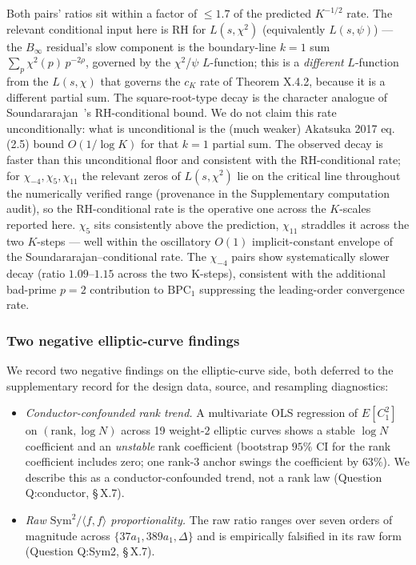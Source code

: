 Both pairs' ratios sit within a factor of \(\le 1.7\) of the
predicted \(K^{-1/2}\) rate. The relevant conditional input here is
RH for \(L(s, \chi^2)\) (equivalently \(L(s,\psi)\)) --- the \(B_\infty\)
residual's slow component is the boundary-line \(k = 1\) sum
\(\sum_p \chi^2(p)\,p^{-2\rho}\), governed by the \(\chi^2\)/\(\psi\)
\(L\)-function; this is a \emph{different} \(L\)-function from the
\(L(s,\chi)\) that governs the \(c_K\) rate of Theorem X.4.2, because
it is a different partial sum. The square-root-type decay is the
character analogue of Soundararajan~\cite{Soundararajan2009}'s RH-conditional bound.
We do not claim this rate unconditionally: what is unconditional
is the (much weaker) Akatsuka 2017 eq. (2.5) bound \(O(1/\log K)\)
for that \(k = 1\) partial sum. The observed decay is faster than
this unconditional floor and consistent with the RH-conditional
rate; for \(\chi_{-4}, \chi_5, \chi_{11}\) the relevant zeros of
\(L(s,\chi^2)\) lie on the critical line throughout the numerically
verified range (provenance in the Supplementary computation
audit), so the RH-conditional rate is the operative one across
the \(K\)-scales reported here.
\(\chi_5\) sits consistently above the prediction, \(\chi_{11}\)
straddles it across the two \(K\)-steps --- well within the
oscillatory \(O(1)\) implicit-constant envelope of the
Soundararajan--conditional rate. The \(\chi_{-4}\) pairs show systematically slower decay
(ratio \(1.09\)--\(1.15\) across the two K-steps), consistent with the
additional bad-prime \(p = 2\) contribution to \(\mathrm{BPC}_1\)
suppressing the leading-order convergence rate.

\subsubsection{Two negative elliptic-curve findings}

We record two negative findings on the elliptic-curve side, both
deferred to the supplementary record for the design data, source,
and resampling diagnostics:

\begin{itemize}
\item
  \emph{Conductor-confounded rank trend.} A multivariate OLS regression
  of \(E[C_1^2]\) on \((\mathrm{rank}, \log N)\) across 19 weight-\(2\)
  elliptic curves shows a stable \(\log N\) coefficient and an
  \emph{unstable} rank coefficient (bootstrap \(95\%\) CI for the rank
  coefficient includes zero; one rank-\(3\) anchor swings the
  coefficient by \(63\%\)). We describe this as a
  conductor-confounded trend, not a rank law (Question Q:conductor,
  \S\,X.7).
\item
  \emph{Raw \(\mathrm{Sym}^2 / \langle f, f \rangle\) proportionality.}
  The raw ratio ranges over seven orders of magnitude across
  \(\{37a_1, 389a_1, \Delta\}\) and is empirically falsified in its
  raw form (Question Q:Sym2, \S\,X.7).
\end{itemize}

